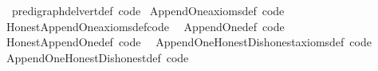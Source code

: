 \begin{isabellebody}
\endisatagproof
{\isafoldproof}%
%
\isadelimproof
\isanewline
%
\endisadelimproof
{}\isamarkupfalse%
%
\isadelimdocument
%
\endisadelimdocument
%
\isatagdocument
%
\isamarkuptrue%
%
\endisatagdocument
{\isafolddocument}%
%
\isadelimdocument
%
\endisadelimdocument
{}\isamarkupfalse%
\ \ pre{\isacharunderscore}{\kern0pt}digraph{\isachardot}{\kern0pt}del{\isacharunderscore}{\kern0pt}vert{\isacharunderscore}{\kern0pt}def\ {\isacharbrackleft}{\kern0pt}code{\isacharbrackright}{\kern0pt}\isanewline
{}\isamarkupfalse%
\ Append{\isacharunderscore}{\kern0pt}One{\isacharunderscore}{\kern0pt}axioms{\isacharunderscore}{\kern0pt}def\ {\isacharbrackleft}{\kern0pt}code{\isacharbrackright}{\kern0pt}\ \isanewline
{}\isamarkupfalse%
\ Honest{\isacharunderscore}{\kern0pt}Append{\isacharunderscore}{\kern0pt}One{\isacharunderscore}{\kern0pt}axioms{\isacharunderscore}{\kern0pt}def{\isacharbrackleft}{\kern0pt}code{\isacharbrackright}{\kern0pt}\ \isanewline
{}\isamarkupfalse%
\ Append{\isacharunderscore}{\kern0pt}One{\isacharunderscore}{\kern0pt}def\ {\isacharbrackleft}{\kern0pt}code{\isacharbrackright}{\kern0pt}\ \isanewline
{}\isamarkupfalse%
\ Honest{\isacharunderscore}{\kern0pt}Append{\isacharunderscore}{\kern0pt}One{\isacharunderscore}{\kern0pt}def\ {\isacharbrackleft}{\kern0pt}code{\isacharbrackright}{\kern0pt}\ \isanewline
{}\isamarkupfalse%
\ Append{\isacharunderscore}{\kern0pt}One{\isacharunderscore}{\kern0pt}Honest{\isacharunderscore}{\kern0pt}Dishonest{\isacharunderscore}{\kern0pt}axioms{\isacharunderscore}{\kern0pt}def\ {\isacharbrackleft}{\kern0pt}code{\isacharbrackright}{\kern0pt}\isanewline
{}\isamarkupfalse%
\ Append{\isacharunderscore}{\kern0pt}One{\isacharunderscore}{\kern0pt}Honest{\isacharunderscore}{\kern0pt}Dishonest{\isacharunderscore}{\kern0pt}def\ {\isacharbrackleft}{\kern0pt}code{\isacharbrackright}{\kern0pt}\isanewline
\isanewline
\isanewline
\isanewline
%
\isadelimtheory
\isanewline
%
\endisadelimtheory
%
\isatagtheory
{}\isamarkupfalse%
%
\endisatagtheory
{\isafoldtheory}%
%
\isadelimtheory
%
\endisadelimtheory
%
\end{isabellebody}%
\endinput
